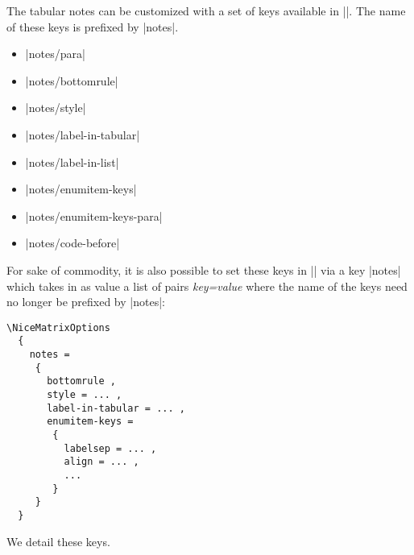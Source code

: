 \documentclass[dvipsnames]{article}%
\begin{document}
The tabular notes can be customized with a set of keys available in
|\NiceMatrixOptions|. The name of these keys is prefixed by |notes|.
\begin{itemize}
\item |notes/para| 
\item |notes/bottomrule| 
\item |notes/style| 
\item |notes/label-in-tabular| 
\item |notes/label-in-list| 
\item |notes/enumitem-keys| 
\item |notes/enumitem-keys-para| 
\item |notes/code-before|
\end{itemize}
For sake of commodity, it is also possible to set these keys in
|\NiceMatrixOptions| via a key |notes| which takes in as value a list of 
pairs \textsl{key=value} where the name of the keys need no longer be
prefixed by |notes|:
\begin{center}
\begin{BVerbatim}[formatcom = \small \color{gray}]
\NiceMatrixOptions
  {
    notes = 
     {
       bottomrule ,
       style = ... ,
       label-in-tabular = ... ,
       enumitem-keys = 
        {
          labelsep = ... ,
          align = ... ,
          ...
        }
     }
  }
\end{BVerbatim}
\end{center}


\bigskip
We detail these keys.
\end{document}
